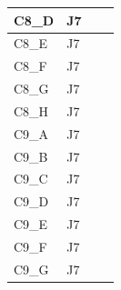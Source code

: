 \begin{longtable}{|l|l|l|l|}
C8\_D                           & J7                                                &                                                  &                                                  \\ \hline
C8\_E                           & J7                                                &                                                  &                                                  \\ \hline
C8\_F                           & J7                                                &                                                  &                                                  \\ \hline
C8\_G                           & J7                                                &                                                  &                                                  \\ \hline
C8\_H                           & J7                                                &                                                  &                                                  \\ \hline
C9\_A                           & J7                                                &                                                  &                                                  \\ \hline
C9\_B                           & J7                                                &                                                  &                                                  \\ \hline
C9\_C                           & J7                                                &                                                  &                                                  \\ \hline
C9\_D                           & J7                                                &                                                  &                                                  \\ \hline
C9\_E                           & J7                                                &                                                  &                                                  \\ \hline
C9\_F                           & J7                                                &                                                  &                                                  \\ \hline
C9\_G                           & J7                                                &                                                  &                                                  \\ \hline

\end{longtable}
